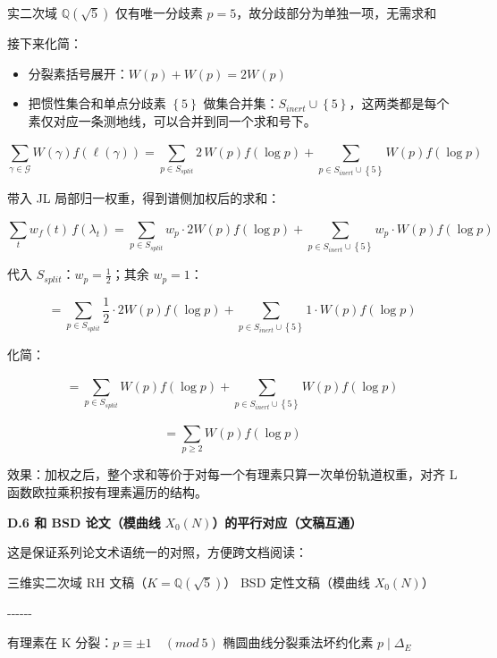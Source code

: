 \documentclass[11pt,a4paper]{ctexart}
\begin{document}
实二次域 \(\mathbb{Q}\left( \sqrt{5} \right)\) 仅有唯一分歧素
\(p = 5\)，故分歧部分为单独一项，无需求和

接下来化简：

\begin{itemize}
\item
  分裂素括号展开：\(W(p) + W(p) = 2W(p)\)
\item
  把惯性集合和单点分歧素 \(\left\{ 5 \right\}\)
  做集合并集：\(S_{inert} \cup \left\{ 5 \right\}\)，这两类都是每个素仅对应一条测地线，可以合并到同一个求和号下。
\end{itemize}

\[\sum_{\gamma\mathcal{\in G}}^{}W(\gamma)f\left( \ell\left(\gamma\right) \right) = \sum_{p \in S_{split}}^{}2\, W(p)f\left( \log p \right) + \sum_{p \in S_{inert} \cup \left\{ 5 \right\}}^{}W(p)f\left( \log p \right)\]

带入 JL 局部归一权重，得到谱侧加权后的求和：

\[\sum_{t}^{}w_{f}(t)\, f\left( \lambda_{t} \right) = \sum_{p \in S_{split}}^{}w_{p} \cdot 2W(p)f\left( \log p \right) + \sum_{p \in S_{inert} \cup \left\{ 5 \right\}}^{}w_{p} \cdot W(p)f\left( \log p \right)\]

代入 \(S_{split}\)：\(w_{p} = \frac{1}{2}\)；其余 \(w_{p} = 1\)：

\[= \sum_{p \in S_{split}}^{}\frac{1}{2} \cdot 2W(p)f\left( \log p \right) + \sum_{p \in S_{inert} \cup \left\{ 5 \right\}}^{}1 \cdot W(p)f\left( \log p \right)\]

化简：

\[= \sum_{p \in S_{split}}^{}W(p)f\left( \log p \right) + \sum_{p \in S_{inert} \cup \left\{ 5 \right\}}^{}W(p)f\left( \log p \right)\]

\[= \sum_{p \geq 2}^{}W(p)f\left( \log p \right)\]

效果：加权之后，整个求和等价于对每一个有理素只算一次单份轨道权重，对齐 L
函数欧拉乘积按有理素遍历的结构。

\textbf{D.6 和 BSD 论文（模曲线}
\(X_{0}(N)\)\textbf{）的平行对应（文稿互通）}

这是保证系列论文术语统一的对照，方便跨文档阅读：

\textbar{} 三维实二次域 RH
文稿（\(K = \mathbb{Q}\left( \sqrt{5} \right)\)） \textbar{} BSD
定性文稿（模曲线 \(X_{0}(N)\)） \textbar{}

\textbar-\/-\/-\textbar-\/-\/-\textbar{}

\textbar{} 有理素在 K 分裂：\(p \equiv \pm 1\quad(mod\ 5)\) \textbar{}
椭圆曲线分裂乘法坏约化素 \(p \mid \Delta_{E}\)\textbar{}
\end{document}
